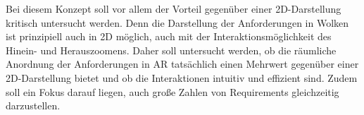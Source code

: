 Bei diesem Konzept soll vor allem der Vorteil gegenüber einer 2D-Darstellung kritisch untersucht werden.
Denn die Darstellung der Anforderungen in Wolken ist prinzipiell auch in 2D möglich, auch mit der Interaktionsmöglichkeit des Hinein- und Herauszoomens.
Daher soll untersucht werden, ob die räumliche Anordnung der Anforderungen in AR tatsächlich einen Mehrwert gegenüber einer 2D-Darstellung bietet und ob die Interaktionen intuitiv und effizient sind.
Zudem soll ein Fokus darauf liegen, auch große Zahlen von Requirements gleichzeitig darzustellen.